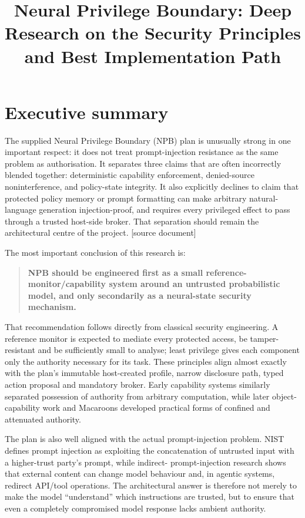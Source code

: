 \documentclass[11pt,a4paper]{article}
\begin{document}
\title{Neural Privilege Boundary: Deep Research on the Security Principles and Best Implementation Path}
\date{}
\maketitle
\section*{Executive summary}
The supplied Neural Privilege Boundary (NPB) plan is unusually strong in one important respect: it does not treat prompt-injection resistance as the same problem as authorisation. It separates three claims that are often incorrectly blended together: deterministic capability enforcement, denied-source noninterference, and policy-state integrity. It also explicitly declines to claim that protected policy memory or prompt formatting can make arbitrary natural-language generation injection-proof, and requires every privileged effect to pass through a trusted host-side broker. That separation should remain the architectural centre of the project. [source document]\par
The most important conclusion of this research is:\par
\begin{quote}\textbf{NPB should be engineered first as a small reference-monitor/capability system around an untrusted probabilistic model, and only secondarily as a neural-state security mechanism.}\end{quote}
That recommendation follows directly from classical security engineering. A reference monitor is expected to mediate every protected access, be tamper-resistant and be sufficiently small to analyse; least privilege gives each component only the authority necessary for its task. These principles align almost exactly with the plan's immutable host-created profile, narrow disclosure path, typed action proposal and mandatory broker. Early capability systems similarly separated possession of authority from arbitrary computation, while later object-capability work and Macaroons developed practical forms of confined and attenuated authority.\par
The plan is also well aligned with the actual prompt-injection problem. NIST defines prompt injection as exploiting the concatenation of untrusted input with a higher-trust party's prompt, while indirect- prompt-injection research shows that external content can change model behaviour and, in agentic systems, redirect API/tool operations. The architectural answer is therefore not merely to make the model “understand” which instructions are trusted, but to ensure that even a completely compromised model response lacks ambient authority.\par
\end{document}
